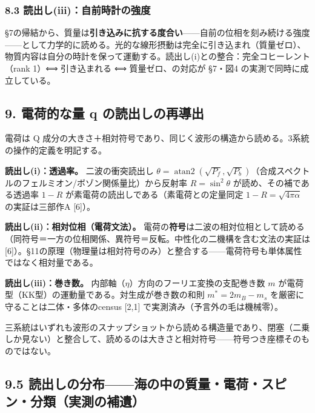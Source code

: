 \documentclass[
  a4paper,
]{ltjsarticle}
\begin{document}
\subsubsection{8.3
読出し(iii)：自前時計の強度}\label{ux8aadux51faux3057iiiux81eaux524dux6642ux8a08ux306eux5f37ux5ea6}

§7の帰結から、質量は\textbf{引き込みに抗する度合い}------自前の位相を刻み続ける強度------として力学的に読める。光的な線形摂動は完全に引き込まれ（質量ゼロ）、物質内容は自分の時計を保って運動する。読出し(i)との整合：完全コヒーレント（rank
1）⟺ 引き込まれる ⟺ 質量ゼロ、の対応が §7・図4
の実測で同時に成立している。

\subsection{9. 電荷的な量 q
の読出しの再導出}\label{ux96fbux8377ux7684ux306aux91cf-q-ux306eux8aadux51faux3057ux306eux518dux5c0eux51fa}

電荷は Q
成分の大きさ＋相対符号であり、同じく波形の構造から読める。3系統の操作的定義を明記する。

\textbf{読出し(i)：透過率。} 二波の衝突読出し
\(\theta = \operatorname{atan2}(\sqrt{P_f}, \sqrt{P_b})\)（合成スペクトルのフェルミオン/ボゾン関係量比）から反射率
\(R=\sin^2\theta\) が読め、その補である透過率 \(1-R\)
が素電荷の読出しである（素電荷との定量同定 \(1-R=\sqrt{4\pi\alpha}\)
の実証は三部作A {[}6{]}）。

\textbf{読出し(ii)：相対位相（電荷文法）。}
電荷の\textbf{符号}は二波の相対位相として読める（同符号＝一方の位相関係、異符号＝反転。中性化の二機構を含む文法の実証は
{[}6{]}）。§11の原理（物理量は相対符号のみ）と整合する------電荷符号も単体属性ではなく相対量である。

\textbf{読出し(iii)：巻き数。}
内部軸（\(\eta\)）方向のフーリエ変換の支配巻き数 \(m\)
が電荷型（KK型）の運動量である。対生成が巻き数の和則
\(m^* = 2m_B - m_s\) を厳密に守ることは二体・多体のcensus {[}2,1{]}
で実測済み（予言外の毛は機械零）。

三系統はいずれも波形のスナップショットから読める構造量であり、閉塞（二乗しか見ない）と整合して、読めるのは大きさと相対符号------符号つき座標そのものではない。

\subsection{9.5
読出しの分布------海の中の質量・電荷・スピン・分類（実測の補遺）}\label{ux8aadux51faux3057ux306eux5206ux5e03ux6d77ux306eux4e2dux306eux8ceaux91cfux96fbux8377ux30b9ux30d4ux30f3ux5206ux985eux5b9fux6e2cux306eux88dcux907a}
\end{document}

